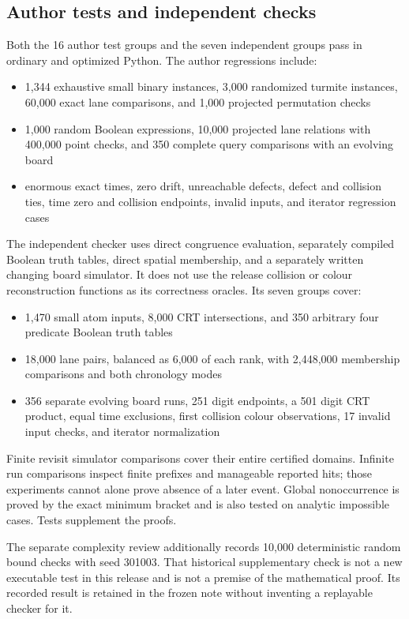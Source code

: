 \documentclass[11pt,letterpaper]{article}
\theoremstyle{definition}\newtheorem{definition}[theorem]{Definition}
\theoremstyle{remark}\newtheorem{remark}[theorem]{Remark}
\begin{document}
\subsection{Author tests and independent checks}
Both the 16 author test groups and the seven independent groups pass in ordinary and optimized Python. The author regressions include:
\begin{itemize}
\item 1,344 exhaustive small binary instances, 3,000 randomized turmite instances, 60,000 exact lane comparisons, and 1,000 projected permutation checks
\item 1,000 random Boolean expressions, 10,000 projected lane relations with 400,000 point checks, and 350 complete query comparisons with an evolving board
\item enormous exact times, zero drift, unreachable defects, defect and collision ties, time zero and collision endpoints, invalid inputs, and iterator regression cases
\end{itemize}
The independent checker uses direct congruence evaluation, separately compiled Boolean truth tables, direct spatial membership, and a separately written changing board simulator. It does not use the release collision or colour reconstruction functions as its correctness oracles. Its seven groups cover:
\begin{itemize}
\item 1,470 small atom inputs, 8,000 CRT intersections, and 350 arbitrary four predicate Boolean truth tables
\item 18,000 lane pairs, balanced as 6,000 of each rank, with 2,448,000 membership comparisons and both chronology modes
\item 356 separate evolving board runs, 251 digit endpoints, a 501 digit CRT product, equal time exclusions, first collision colour observations, 17 invalid input checks, and iterator normalization
\end{itemize}
Finite revisit simulator comparisons cover their entire certified domains. Infinite run comparisons inspect finite prefixes and manageable reported hits; those experiments cannot alone prove absence of a later event. Global nonoccurrence is proved by the exact minimum bracket and is also tested on analytic impossible cases. Tests supplement the proofs.

The separate complexity review additionally records 10,000 deterministic random bound checks with seed 301003. That historical supplementary check is not a new executable test in this release and is not a premise of the mathematical proof. Its recorded result is retained in the frozen note without inventing a replayable checker for it.
\end{document}
